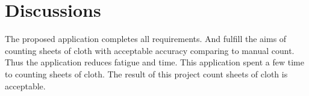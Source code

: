 \section{Discussions}
The proposed application completes all requirements. And fulfill the aims of counting sheets of cloth with acceptable accuracy comparing to manual count. Thus the application reduces fatigue and time. This application spent a few time to counting sheets of cloth. The result of this project count sheets of cloth is acceptable.
